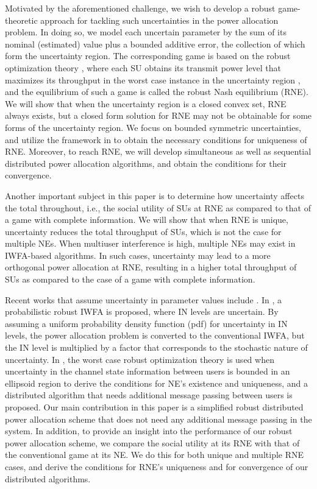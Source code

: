 \documentclass[peerreview,onecolumn,11pt,draftclsnofoot]{IEEEtran}\usepackage{amsmath}\usepackage{amsfonts}\usepackage{epsfig}\usepackage{amssymb}\usepackage{graphicx}\usepackage{amssymb,amsmath}\usepackage{cite}\usepackage{color,soul}\newcommand\T{\rule{0pt}{3.1ex}}
\begin{document}
Motivated by the aforementioned challenge, we wish to
develop a robust game-theoretic approach for tackling such
uncertainties in the power allocation problem. In doing so, we model each uncertain parameter by the sum of its nominal (estimated) value plus a bounded additive error, the collection of which form the uncertainty region. The corresponding game is based on the robust optimization theory \cite{Robustgame}, where each SU obtains its transmit power level that maximizes its throughput in the worst case instance in the uncertainty region \cite{selecectedrobust}, and the equilibrium of such a game is called the robust Nash equilibrium (RNE). We will show that when the uncertainty region is a closed convex set, RNE always exists, but a closed form solution for RNE may not be obtainable for some forms of the uncertainty region. We focus on bounded symmetric uncertainties, and utilize the framework in \cite{Nash1,Nash2} to obtain the necessary conditions for uniqueness of RNE. Moreover, to reach RNE, we will develop simultaneous as well as sequential distributed power allocation algorithms, and obtain the conditions for their convergence.

Another important subject in this paper is to determine how
uncertainty affects the total throughout, i.e., the social utility of SUs at RNE as compared to that of a game with complete information. We will show that when RNE is unique, uncertainty reduces the total throughput of SUs, which is not the case for multiple NEs.  When multiuser interference is high, multiple NEs may exist in IWFA-based algorithms. In such cases, uncertainty may lead to a more orthogonal power allocation at RNE, resulting in a higher total throughput of SUs as compared to the case of a game with complete information.

Recent works that assume uncertainty in parameter values include \cite{ProbabilisticIWFA,Robustnew}. In
\cite{ProbabilisticIWFA}, a probabilistic robust IWFA is proposed, where IN levels are uncertain. By assuming a uniform probability density function (pdf) for uncertainty in IN levels, the power allocation problem is converted to the conventional IWFA, but the IN level is multiplied by a factor that corresponds to the stochastic nature of uncertainty. In \cite{Robustnew}, the worst case robust optimization theory is used when uncertainty in the channel state information between users is bounded in an ellipsoid region to derive the conditions for NE's existence and uniqueness, and a distributed algorithm that needs additional message passing between users is proposed. Our main contribution in this paper is a simplified robust distributed power allocation scheme that does not need any additional message passing in the system. In addition, to provide an insight into the performance of our robust power allocation scheme, we compare the social utility at its RNE with that of the conventional game at its NE. We do this for both unique and multiple RNE cases, and derive the conditions for RNE's uniqueness and for convergence of our distributed algorithms.
\end{document}
